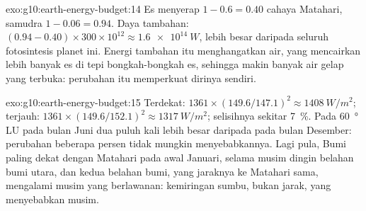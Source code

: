 \begin{solution}{exo:g10:earth-energy-budget:14}
Es menyerap $1 - 0.6 = 0.40$ cahaya Matahari, samudra $1 - 0.06 =
0.94$. Daya tambahan: $(0.94 - 0.40) \times 300 \times 10^{12} \approx
\qty{1.6e14}{W}$, lebih besar daripada seluruh fotosintesis planet ini. Energi
tambahan itu menghangatkan air, yang mencairkan lebih banyak es di tepi
bongkah-bongkah es, sehingga makin banyak air gelap yang terbuka: perubahan
itu memperkuat dirinya sendiri.
\end{solution}

\begin{solution}{exo:g10:earth-energy-budget:15}
Terdekat: $1361 \times (149.6/147.1)^2 \approx \qty{1408}{W/m^2}$; terjauh:
$1361 \times (149.6/152.1)^2 \approx \qty{1317}{W/m^2}$; selisihnya sekitar
\qty{7}{\percent}. Pada \qty{60}{\degree} LU  pada bulan Juni dua puluh
kali lebih besar daripada pada bulan Desember: perubahan beberapa persen tidak
mungkin menyebabkannya. Lagi pula, Bumi paling dekat dengan Matahari pada awal
Januari, selama musim dingin belahan bumi utara, dan kedua belahan bumi, yang
jaraknya ke Matahari sama, mengalami musim yang berlawanan: kemiringan sumbu,
bukan jarak, yang menyebabkan musim.
\end{solution}

